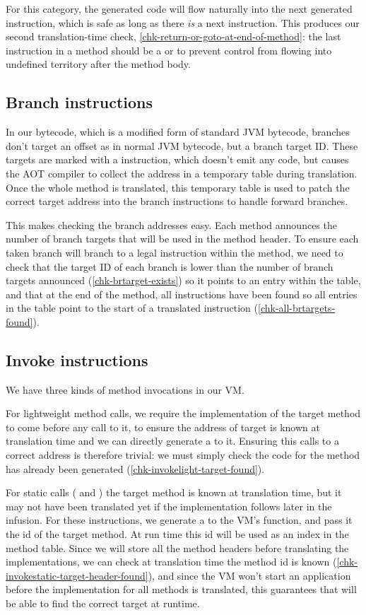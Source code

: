 For this category, the generated code will flow naturally into the next generated instruction, which is safe as long as there \emph{is} a next instruction. This produces our second translation-time check, \ref{chk-return-or-goto-at-end-of-method}: the last instruction in a method should be a  or  to prevent control from flowing into undefined territory after the method body.

\subsection{Branch instructions}
In our bytecode, which is a modified form of standard JVM bytecode, branches don't target an offset as in normal JVM bytecode, but a branch target ID. These targets are marked with a  instruction, which doesn't emit any code, but causes the AOT compiler to collect the address in a temporary table during translation. Once the whole method is translated, this temporary table is used to patch the correct target address into the branch instructions to handle forward branches.

This makes checking the branch addresses easy. Each method announces the number of branch targets that will be used in the method header. To ensure each taken branch will branch to a legal instruction within the method, we need to check that the target ID of each branch is lower than the number of branch targets announced (\ref{chk-brtarget-exists}) so it points to an entry within the table, and that at the end of the method, all  instructions have been found so all entries in the table point to the start of a translated instruction (\ref{chk-all-brtargets-found}).

\subsection{Invoke instructions}
We have three kinds of method invocations in our VM.

For lightweight method calls, we require the implementation of the target method to come before any call to it, to ensure the address of target is known at translation time and we can directly generate a  to it. Ensuring this calls to a correct address is therefore trivial: we must simply check the code for the method has already been generated (\ref{chk-invokelight-target-found}).

For static calls ( and ) the target method is known at translation time, but it may not have been translated yet if the implementation follows later in the infusion. For these instructions, we generate a  to the VM's  function, and pass it the id of the target method. At run time this id will be used as an index in the method table. Since we will store all the method headers before translating the implementations, we can check at translation time the method id is known (\ref{chk-invokestatic-target-header-found}), and since the VM won't start an application before the implementation for all methods is translated, this guarantees that  will be able to find the correct target at runtime.

